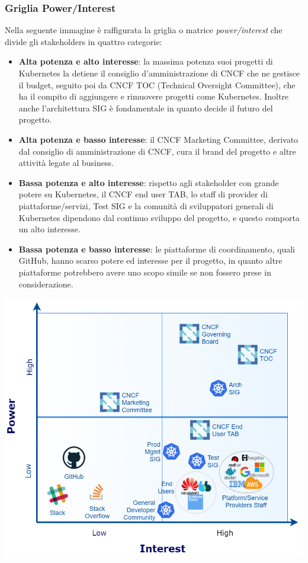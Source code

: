 \documentclass[12pt, a4paper]{report}
\begin{document}
\subsubsection{Griglia Power/Interest}
Nella seguente immagine è raffigurata la griglia o matrice \textit{power/interest} che divide gli stakeholders in quattro categorie:
\begin{itemize}
  \item \textbf{Alta potenza e alto interesse}: la massima potenza suoi progetti di Kubernetes la detiene il consiglio d'amministrazione di CNCF che ne gestisce il budget, seguito poi da CNCF TOC (Technical Oversight Committee), che ha il compito di aggiungere e rimuovere progetti come Kubernetes. Inoltre anche l'architettura SIG è fondamentale in quanto decide il futuro del progetto.
  \item \textbf{Alta potenza e basso interesse}: il CNCF Marketing Committee, derivato dal consiglio di amministrazione di CNCF, cura il brand del progetto e altre attività legate al business.
  \item \textbf{Bassa potenza e alto interesse}: rispetto agli stakeholder con grande potere su Kubernetes, il CNCF end user TAB, lo staff di provider di piattaforme/servizi, Test SIG e la comunità di sviluppatori generali di Kubernetes dipendono dal continuo sviluppo del progetto, e questo comporta un alto interesse.
  \item \textbf{Bassa potenza e basso interesse}: le piattaforme di coordinamento, quali GitHub, hanno scarso potere ed interesse per il progetto, in quanto altre piattaforme potrebbero avere uno scopo simile se non fossero prese in considerazione.
\end{itemize}
\begin{center}
  \includegraphics[scale = 0.45]{Images/power-interest}
\end{center}
\newpage
\end{document}
